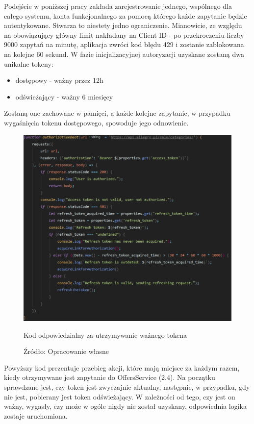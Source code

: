 Podejście w poniższej pracy zakłada zarejestrowanie jednego, wspólnego dla całego systemu, konta funkcjonalnego za pomocą którego każde zapytanie będzie autentykowane. Stwarza to niestety jedno ograniczenie. Mianowicie, ze względu na obowiązujący główny limit nakładany na Client ID  - po przekroczeniu liczby 9000 zapytań na minutę, aplikacja zwróci kod błędu 429 i zostanie zablokowana na kolejne 60 sekund.\newline
W fazie inicjalizacyjnej autoryzacji uzyskane zostaną dwa unikalne tokeny: 
\begin{itemize}
	\item dostępowy - ważny przez 12h
	\item odświeżający - ważny 6 miesięcy
\end{itemize}
Zostaną one zachowane w pamięci, a każde kolejne zapytanie, w przypadku wygaśnięcia tokenu dostępowego, spowoduje jego odnowienie.
\begin{figure}[H]
	\centering
	\includegraphics[width=\linewidth]{authorization.pdf}
	\caption{\centering Kod odpowiedzialny za utrzymywanie ważnego tokena}
	\caption*{\centering Źródło: {Opracowanie własne}}
\end{figure}
Powyższy kod prezentuje przebieg akcji, które mają miejsce za każdym razem, kiedy otrzymywane jest zapytanie do OffersService (2.4). Na początku sprawdzane jest, czy token jest zwyczajnie aktualny, następnie, w przypadku, gdy nie jest, pobierany jest token odświeżający. W zależności od tego, czy jest on ważny, wygasły, czy może w ogóle nigdy nie został uzyskany, odpowiednia logika zostaje uruchomiona.

